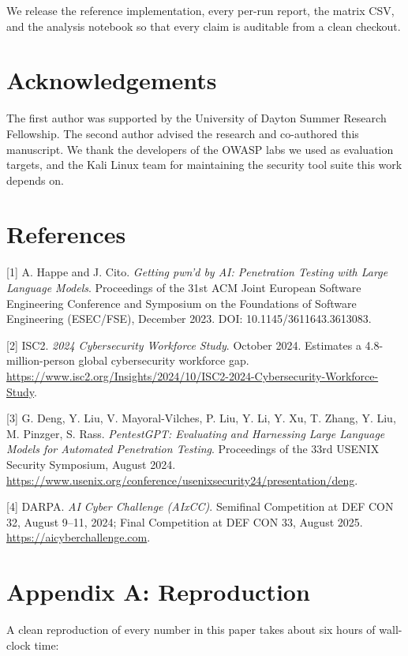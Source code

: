 \documentclass[
]{article}
\begin{document}
We release the reference implementation, every per-run report, the
matrix CSV, and the analysis notebook so that every claim is auditable
from a clean checkout.

\section{Acknowledgements}\label{acknowledgements}

The first author was supported by the University of Dayton Summer
Research Fellowship. The second author advised the research and
co-authored this manuscript. We thank the developers of the OWASP labs
we used as evaluation targets, and the Kali Linux team for maintaining
the security tool suite this work depends on.

\section{References}\label{references}

{[}1{]} A. Happe and J. Cito. \emph{Getting pwn'd by AI: Penetration
Testing with Large Language Models}. Proceedings of the 31st ACM Joint
European Software Engineering Conference and Symposium on the
Foundations of Software Engineering (ESEC/FSE), December 2023. DOI:
10.1145/3611643.3613083.

{[}2{]} ISC2. \emph{2024 Cybersecurity Workforce Study}. October 2024.
Estimates a 4.8-million-person global cybersecurity workforce gap.
\url{https://www.isc2.org/Insights/2024/10/ISC2-2024-Cybersecurity-Workforce-Study}.

{[}3{]} G. Deng, Y. Liu, V. Mayoral-Vilches, P. Liu, Y. Li, Y. Xu, T.
Zhang, Y. Liu, M. Pinzger, S. Rass. \emph{PentestGPT: Evaluating and
Harnessing Large Language Models for Automated Penetration Testing}.
Proceedings of the 33rd USENIX Security Symposium, August 2024.
\url{https://www.usenix.org/conference/usenixsecurity24/presentation/deng}.

{[}4{]} DARPA. \emph{AI Cyber Challenge (AIxCC)}. Semifinal Competition
at DEF CON 32, August 9--11, 2024; Final Competition at DEF CON 33,
August 2025. \url{https://aicyberchallenge.com}.

\section{Appendix A: Reproduction}\label{appendix-a-reproduction}

A clean reproduction of every number in this paper takes about six hours
of wall-clock time:
\end{document}
